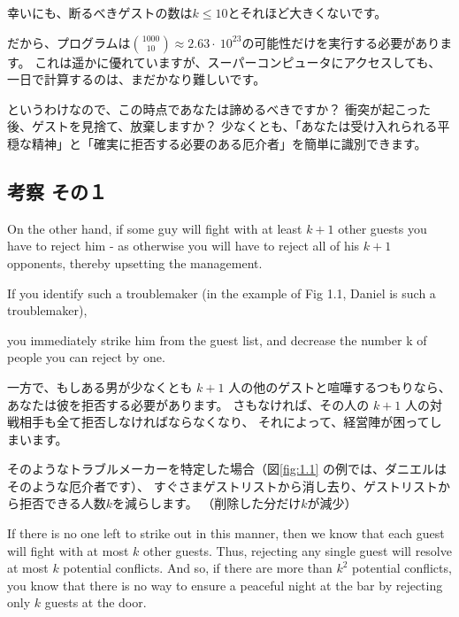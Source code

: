 \documentclass{jsarticle}
\begin{document}
幸いにも、断るべきゲストの数は$k \leq 10$とそれほど大きくないです。

だから、プログラムは$\binom{1000}{10} \approx 2.63 \cdot\ 10^{23}$の可能性だけを実行する必要があります。
これは遥かに優れていますが、スーパーコンピュータにアクセスしても、一日で計算するのは、まだかなり難しいです。


というわけなので、この時点であなたは諦めるべきですか？
衝突が起こった後、ゲストを見捨て、放棄しますか？
少なくとも、「あなたは受け入れられる平穏な精神」と「確実に拒否する必要のある厄介者」を簡単に識別できます。


\newpage

\subsection{考察 その１}

\begin{screen}
    On the other hand, if some guy will fight with at least $k+1$ other guests you have to reject him - as
    otherwise you will have to reject all of his $k+1$ opponents, thereby upsetting the management. 
    
    If you identify such a troublemaker (in the example of  Fig 1.1, Daniel is such a troublemaker), 

    you immediately strike him from the guest list, and decrease the number k of people you can reject by one.   
\end{screen}

一方で、もしある男が少なくとも $k+1$ 人の他のゲストと喧嘩するつもりなら、
あなたは彼を拒否する必要があります。
さもなければ、その人の $k+1$ 人の対戦相手も全て拒否しなければならなくなり、
それによって、経営陣が困ってしまいます。

そのようなトラブルメーカーを特定した場合（図\ref{fig:1.1} の例では、ダニエルはそのような厄介者です）、
すぐさまゲストリストから消し去り、ゲストリストから拒否できる人数$k$を減らします。
（削除した分だけ$k$が減少）

\begin{screen}
If there is no one left to strike out in this manner, 
then we know that each guest will fight with at most $k$ other guests. Thus, rejecting any single guest will resolve at most $k$ potential conflicts. 
And so, if there are more than $ {k}^{2} $ potential conflicts, you know that there is no way to ensure a peaceful night at the bar by rejecting only $k$ guests at the door. 
\end{screen}
\end{document}
